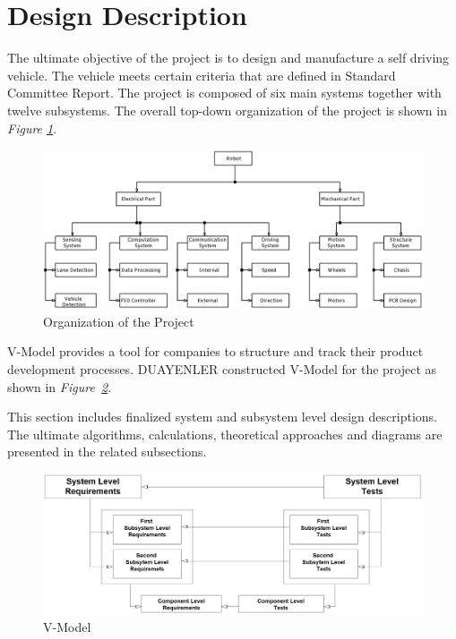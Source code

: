 \documentclass[a4paper,12pt]{article}
\begin{document}
\newpage




\section{Design Description} 
	
	The ultimate objective of the project is to design and manufacture a self driving vehicle. The vehicle meets certain criteria that are defined in Standard Committee Report. The project is composed of six main systems together with twelve subsystems. The overall top-down organization of the project is shown in \textit{Figure \ref{fig:organization}}.


	\begin{figure}[h]
		\includegraphics[width=\textwidth,center]{images/system}
		\caption{Organization of the Project}\label{fig:organization}
	\end{figure}

	V-Model provides a tool for companies to structure and track their product development processes. DUAYENLER constructed V-Model for the project as shown in \textit{Figure~\ref{fig:vmodel}}. 

	This section includes finalized system and subsystem level design descriptions. The ultimate algorithms, calculations, theoretical approaches and diagrams are presented in the related subsections.

	
	\begin{figure}[h]
		\includegraphics[width=\textwidth,center]{images/vModels/vmodel}
		\caption{V-Model}\label{fig:vmodel}
	\end{figure}
\end{document}
